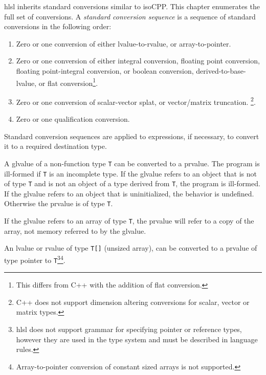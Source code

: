 
\p \acrshort{hlsl} inherits standard conversions similar to \gls{isoCPP}. This
chapter enumerates the full set of conversions. A \textit{standard conversion
sequence} is a sequence of standard conversions in the following
order:
\begin{enumerate}
  \item Zero or one conversion of either lvalue-to-rvalue, or array-to-pointer.
  \item Zero or one conversion of either integral conversion, floating point
  conversion, floating point-integral conversion, or boolean conversion,
  derived-to-base-lvalue, or flat conversion\footnote{This differs from C++ with
  the addition of flat conversion.}.
  \item Zero or one conversion of scalar-vector splat, or vector/matrix
  truncation. \footnote{C++ does not support dimension altering conversions for
  scalar, vector or matrix types.}.
  \item Zero or one qualification conversion.
\end{enumerate}

Standard conversion sequences are applied to expressions, if necessary, to
convert it to a required destination type.


\p A glvalue of a non-function type \texttt{T} can be converted to a prvalue.
The program is ill-formed if \texttt{T} is an incomplete type. If the glvalue
refers to an object that is not of type \texttt{T} and is not an object of a
type derived from \texttt{T}, the program is ill-formed. If the glvalue refers to
an object that is uninitialized, the behavior is undefined. Otherwise the
prvalue is of type \texttt{T}.

\p If the glvalue refers to an array of type \texttt{T}, the prvalue will refer
to a copy of the array, not memory referred to by the glvalue.


\p An lvalue or rvalue of type \texttt{T[]} (unsized array), can be converted to
a prvalue of type pointer to \texttt{T}\footnote{\acrshort{hlsl} does not
support grammar for specifying pointer or reference types, however they are used
in the type system and must be described in language
rules.}\footnote{Array-to-pointer conversion of constant sized arrays is not
supported.}.


